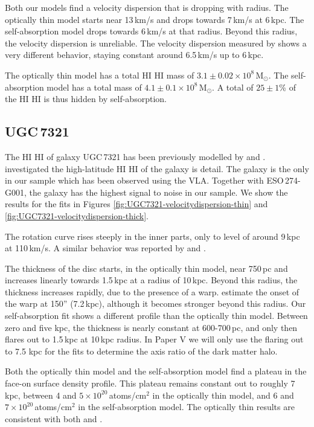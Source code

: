 \documentclass[useAMS,usenatbib]{mn2e}
\newcommand{\hi}{%
  \relax
  \ifmmode
    \textrm{\textsc{HI}}
  \else
    \textsc{H{\smaller}I}
  \fi
}
\begin{document}
Both our models find a velocity dispersion that is dropping with radius. 
The optically thin model starts near 13\,km/s and drops towards 7\,km/s 
at 6\,kpc.
The self-absorption model drops towards 6\,km/s at that radius.
Beyond this radius, the velocity dispersion is unreliable. 
The velocity dispersion measured by \citet{OBrien2010C} shows a very 
different behavior, staying constant around 6.5\,km/s up to 6\,kpc.

The optically thin model has a total \hi mass of 
$3.1\pm0.02\times10^8$\,M$_\odot$.
The self-absorption model has a total mass of $4.1\pm0.1\times10^8$\,M$_\odot$.
A total of $25\pm1$\% of the \hi is thus hidden by self-absorption.

\subsection{UGC\,7321}
The \hi of galaxy UGC\,7321 has been previously modelled  by 
\citet{Uson2003A} and \citet{OBrien2010A}.
\citet{Matthews2003A} investigated the high-latitude \hi of 
the galaxy is detail.
The galaxy is the only in our sample which has been observed 
using the VLA.
Together with ESO\,274-G001, the galaxy has the highest signal 
to noise in our sample.
We show the results for the fits in Figures 
\ref{fig:UGC7321-velocitydispersion-thin} and 
\ref{fig:UGC7321-velocitydispersion-thick}.

The rotation curve rises steeply in the inner 
parts, only to level of around 9\,kpc at 110\,km/s. 
A similar behavior was reported by \citet{Uson2003A} and \citet{OBrien2010A}.

The thickness of the disc starts, in the optically 
thin model, near 750\,pc and increases linearly 
towards 1.5\,kpc at a radius of 10\,kpc. 
Beyond this radius, the thickness increases rapidly, 
due to the presence of a warp.
\citet{Uson2003A} estimate the onset of the warp at 
150'' (7.2\,kpc), although it becomes stronger beyond this radius.
Our self-absorption fit shows a different profile than 
the optically thin model. 
Between zero and five kpc, the thickness is nearly constant 
at 600-700\,pc, and only then flares out to 1.5\,kpc at 10\,kpc radius.
In Paper V we will only use the flaring 
out to 7.5 kpc for the fits to determine the axis ratio of the dark matter 
halo.

Both the optically thin model and the self-absorption 
model find a plateau in the face-on surface density profile.
This plateau remains constant out to roughly 7\,kpc, 
between 4 and $5\times10^{20}$\,atoms/cm$^2$ in the optically 
thin model, and 6 and $7\times10^{20}$\,atoms/cm$^2$ in the 
self-absorption model.
The optically thin results are consistent with both \citet{Uson2003A} and 
\citet{OBrien2010A}.
\end{document}

